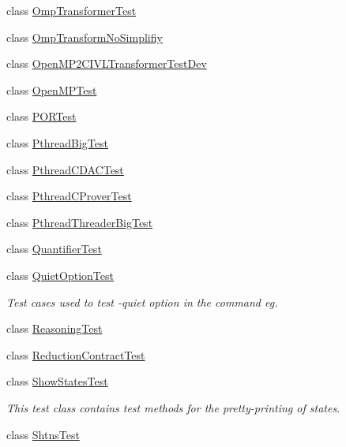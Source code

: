 \begin{DoxyCompactItemize}
class \hyperlink{classedu_1_1udel_1_1cis_1_1vsl_1_1civl_1_1OmpTransformerTest}{Omp\+Transformer\+Test}
\item 
class \hyperlink{classedu_1_1udel_1_1cis_1_1vsl_1_1civl_1_1OmpTransformNoSimplifiy}{Omp\+Transform\+No\+Simplifiy}
\item 
class \hyperlink{classedu_1_1udel_1_1cis_1_1vsl_1_1civl_1_1OpenMP2CIVLTransformerTestDev}{Open\+M\+P2\+C\+I\+V\+L\+Transformer\+Test\+Dev}
\item 
class \hyperlink{classedu_1_1udel_1_1cis_1_1vsl_1_1civl_1_1OpenMPTest}{Open\+M\+P\+Test}
\item 
class \hyperlink{classedu_1_1udel_1_1cis_1_1vsl_1_1civl_1_1PORTest}{P\+O\+R\+Test}
\item 
class \hyperlink{classedu_1_1udel_1_1cis_1_1vsl_1_1civl_1_1PthreadBigTest}{Pthread\+Big\+Test}
\item 
class \hyperlink{classedu_1_1udel_1_1cis_1_1vsl_1_1civl_1_1PthreadCDACTest}{Pthread\+C\+D\+A\+C\+Test}
\item 
class \hyperlink{classedu_1_1udel_1_1cis_1_1vsl_1_1civl_1_1PthreadCProverTest}{Pthread\+C\+Prover\+Test}
\item 
class \hyperlink{classedu_1_1udel_1_1cis_1_1vsl_1_1civl_1_1PthreadThreaderBigTest}{Pthread\+Threader\+Big\+Test}
\item 
class \hyperlink{classedu_1_1udel_1_1cis_1_1vsl_1_1civl_1_1QuantifierTest}{Quantifier\+Test}
\item 
class \hyperlink{classedu_1_1udel_1_1cis_1_1vsl_1_1civl_1_1QuietOptionTest}{Quiet\+Option\+Test}
\begin{DoxyCompactList}\small\item\em Test cases used to test -\/quiet option in the command eg. \end{DoxyCompactList}\item 
class \hyperlink{classedu_1_1udel_1_1cis_1_1vsl_1_1civl_1_1ReasoningTest}{Reasoning\+Test}
\item 
class \hyperlink{classedu_1_1udel_1_1cis_1_1vsl_1_1civl_1_1ReductionContractTest}{Reduction\+Contract\+Test}
\item 
class \hyperlink{classedu_1_1udel_1_1cis_1_1vsl_1_1civl_1_1ShowStatesTest}{Show\+States\+Test}
\begin{DoxyCompactList}\small\item\em This test class contains test methods for the pretty-\/printing of states. \end{DoxyCompactList}\item 
class \hyperlink{classedu_1_1udel_1_1cis_1_1vsl_1_1civl_1_1ShtnsTest}{Shtns\+Test}

\end{DoxyCompactItemize}
